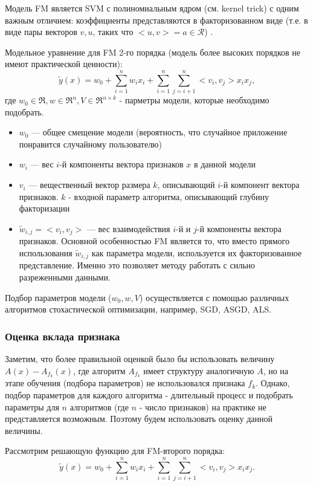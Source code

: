 \documentclass[12pt,a4paper]{report}
\begin{document}
Модель FM является SVM с полиномиальным ядром (см. kernel trick) с одним важным отличием: коэффициенты представляются в факторизованном виде (т.е. в виде пары векторов $v, u$, таких что $<u,v> = a \in \mathcal{R}$) \cite{Fm}.

Модельное уравнение для FM 2-го порядка (модель более высоких порядков не имеют практической ценности):
\begin{equation}
\tilde{y}(x) = w_0 + \sum_{i=1}^{n}w_ix_i + \sum_{i=1}^{n}\sum_{j=i+1}^{n}<v_i, v_j>x_ix_j,
\end{equation}
где $w_0 \in \mathfrak{R}, w \in \mathfrak{R}^n, V \in \mathfrak{R}^{n \times k}$ - парметры модели, которые необходимо подобрать.
\begin{itemize}
\item $w_0$ --- общее смещение модели (вероятность, что случайное приложение понравится случайному пользователю)
\item $w_i$ --- вес $i$-й компоненты вектора признаков $x$ в данной модели
\item $v_i$ --- вещественный вектор размера $k$, описывающий $i$-й компонент вектора признаков. $k$ -  входной параметр алгоритма, описывающий глубину факторизации
\item $\tilde{w}_{i,j} = <v_i, v_j>$ --- вес взаимодействия $i$-й и $j$-й компоненты вектора признаков. Основной особенностью FM является то, что вместо прямого использования $\tilde{w}_{i,j}$ как параметра модели, используется их факторизованное представление. Именно это позволяет методу работать с сильно разреженными данными.
\end{itemize}

Подбор параметров модели ($w_0, w, V$) осуществляется с помощью различных алгоритмов стохастической оптимизации, например, SGD, ASGD, ALS.

\subsubsection{Оценка вклада признака}
Заметим, что более правильной оценкой было бы использовать величину $A(x) - A_{f_k}(x)$, где алгоритм $A_{f_k}$ имеет структуру аналогичную $A$, но на этапе обучения (подбора параметров) не использовался признака $f_k$. Однако, подбор параметров для каждого алгоритма - длительный процесс и подобрать параметры для $n$ алгоритмов (где $n$ - число признаков) на практике не представляется возможным. Поэтому будем использовать оценку данной величины.

Рассмотрим решающую функцию для FM-второго порядка:
\begin{equation*}
\tilde{y}(x) = w_0 + \sum_{i=1}^{n}w_ix_i + \sum_{i=1}^{n}\sum_{j=i+1}^{n}<v_i, v_j>x_ix_j.
\end{equation*}
\end{document}

